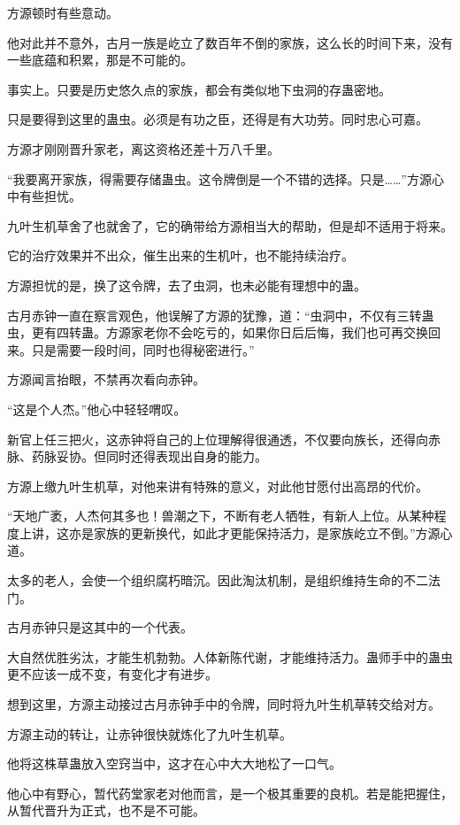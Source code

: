 \begin{this_body}
方源顿时有些意动。

他对此并不意外，古月一族是屹立了数百年不倒的家族，这么长的时间下来，没有一些底蕴和积累，那是不可能的。

事实上。只要是历史悠久点的家族，都会有类似地下虫洞的存蛊密地。

只是要得到这里的蛊虫。必须是有功之臣，还得是有大功劳。同时忠心可嘉。

方源才刚刚晋升家老，离这资格还差十万八千里。

“我要离开家族，得需要存储蛊虫。这令牌倒是一个不错的选择。只是……”方源心中有些担忧。

九叶生机草舍了也就舍了，它的确带给方源相当大的帮助，但是却不适用于将来。

它的治疗效果并不出众，催生出来的生机叶，也不能持续治疗。

方源担忧的是，换了这令牌，去了虫洞，也未必能有理想中的蛊。

古月赤钟一直在察言观色，他误解了方源的犹豫，道：“虫洞中，不仅有三转蛊虫，更有四转蛊。方源家老你不会吃亏的，如果你日后后悔，我们也可再交换回来。只是需要一段时间，同时也得秘密进行。”

方源闻言抬眼，不禁再次看向赤钟。

“这是个人杰。”他心中轻轻喟叹。

新官上任三把火，这赤钟将自己的上位理解得很通透，不仅要向族长，还得向赤脉、药脉妥协。但同时还得表现出自身的能力。

方源上缴九叶生机草，对他来讲有特殊的意义，对此他甘愿付出高昂的代价。

“天地广袤，人杰何其多也！兽潮之下，不断有老人牺牲，有新人上位。从某种程度上讲，这亦是家族的更新换代，如此才更能保持活力，是家族屹立不倒。”方源心道。

太多的老人，会使一个组织腐朽暗沉。因此淘汰机制，是组织维持生命的不二法门。

古月赤钟只是这其中的一个代表。

大自然优胜劣汰，才能生机勃勃。人体新陈代谢，才能维持活力。蛊师手中的蛊虫更不应该一成不变，有变化才有进步。

想到这里，方源主动接过古月赤钟手中的令牌，同时将九叶生机草转交给对方。

方源主动的转让，让赤钟很快就炼化了九叶生机草。

他将这株草蛊放入空窍当中，这才在心中大大地松了一口气。

他心中有野心，暂代药堂家老对他而言，是一个极其重要的良机。若是能把握住，从暂代晋升为正式，也不是不可能。


\end{this_body}
